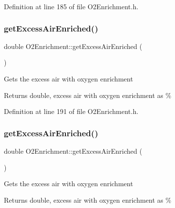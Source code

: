 Definition at line 185 of file O2\+Enrichment.\+h.

\mbox{\label{class_o2_enrichment_ad6e95234bd10eafb98a741e1bd75be58}} 
\subsubsection{\texorpdfstring{get\+Excess\+Air\+Enriched()}{getExcessAirEnriched()}\hspace{0.1cm}{\footnotesize\ttfamily [1/3]}}
{\footnotesize\ttfamily double O2\+Enrichment\+::get\+Excess\+Air\+Enriched (\begin{DoxyParamCaption}{ }\end{DoxyParamCaption})\hspace{0.3cm}{\ttfamily [inline]}}

Gets the excess air with oxygen enrichment \begin{DoxyReturn}{Returns}
double, excess air with oxygen enrichment as \% 
\end{DoxyReturn}


Definition at line 191 of file O2\+Enrichment.\+h.

\mbox{\label{class_o2_enrichment_ad6e95234bd10eafb98a741e1bd75be58}} 
\subsubsection{\texorpdfstring{get\+Excess\+Air\+Enriched()}{getExcessAirEnriched()}\hspace{0.1cm}{\footnotesize\ttfamily [2/3]}}
{\footnotesize\ttfamily double O2\+Enrichment\+::get\+Excess\+Air\+Enriched (\begin{DoxyParamCaption}{ }\end{DoxyParamCaption})\hspace{0.3cm}{\ttfamily [inline]}}

Gets the excess air with oxygen enrichment \begin{DoxyReturn}{Returns}
double, excess air with oxygen enrichment as \% 
\end{DoxyReturn}


